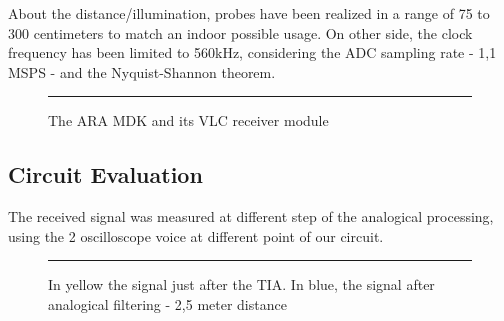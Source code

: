 About the distance/illumination, probes have been realized in a range of 75 to 300 centimeters to match an indoor possible usage. On other side, the clock frequency has been limited to 560kHz, considering the ADC sampling rate - 1,1 MSPS - and the Nyquist-Shannon theorem.

\begin{figure}[htbp]
  \centering
    \rule{35em}{0.5pt}
  \caption[The ARA MDK and its VLC receiver module]{The ARA MDK and its VLC receiver module}
  \label{fig:receiver}
\end{figure}

\subsection{Circuit Evaluation}

The received signal was measured at different step of the analogical processing, using the 2 oscilloscope voice at different point of our circuit.

\begin{figure}[htbp]
	\centering
		\rule{35em}{0.5pt}
		\caption[In yellow the signal just after the TIA. In blue, the signal after analogical filtering - 2,5 meter distance]{In yellow the signal just after the TIA. In blue, the signal after analogical filtering - 2,5 meter distance}
		\label{fig:circuit-compare}
	\end{figure}
	
